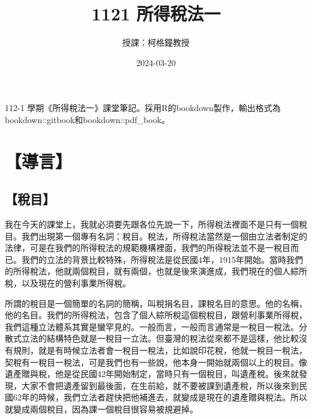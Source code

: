\documentclass[oneside,sub3section]{ctexbook}
\title{1121 所得稅法一}
\author{授課：柯格鐘教授}
\date{2024-03-20}
\begin{document}
\maketitle

\thispagestyle{empty}

\mbox{}
\vspace{10cm}
\begin{center}

    112-1 學期《所得稅法一》課堂筆記。採用R的bookdown製作，輸出格式為bookdown::gitbook和bookdown::pdf\_book。
    
\end{center}

\setlength{\abovedisplayskip}{-5pt}
\setlength{\abovedisplayshortskip}{-5pt}



{
\setcounter{tocdepth}{3}
\tableofcontents
}



\mainmatter

\hypertarget{ux5c0eux8a00}{%
\chapter{【導言】}\label{ux5c0eux8a00}}

\hypertarget{ux7a05ux76ee}{%
\section{【稅目】}\label{ux7a05ux76ee}}

我在今天的課堂上，我就必須要先跟各位先說一下，所得稅法裡面不是只有一個稅目。我們出現第一個專有名詞：稅目。稅法，所得稅法當然是一個由立法者制定的法律，可是在我們的所得稅法的規範機構裡面，我們的所得稅法並不是一稅目而已。我們的立法的背景比較特殊，所得稅法是從民國4年，1915年開始。當時我們的所得稅法，他就兩個稅目，就有兩個，也就是後來演進成，我們現在的個人綜所稅，以及現在的營利事業所得稅。

所謂的稅目是一個簡單的名詞的簡稱，叫稅捐名目，課稅名目的意思。他的名稱，他的名目。我們的所得稅法，包含了個人綜所稅這個稅稅目，跟營利事業所得稅，我們這種立法體系其實是蠻罕見的。一般而言，一般而言通常是一稅目一稅法。分散式立法的結構特色就是一稅目一立法。但臺灣的稅法從來都不是這樣，他比較沒有規則，就是有時候立法者會一稅目一稅法，比如說印花稅，他就一稅目一稅法，契稅有一稅目一稅法，可是我們也有一些說，他本身一開始就兩個以上的稅目。像遺產贈與稅，他是從民國42年開始制定，當時只有一個稅目，叫遺產稅。後來就發現，大家不會把遺產留到最後面，在生前給，就不要被課到遺產稅，所以後來到民國62年的時候，我們立法者趕快把他補進去，就變成是現在的遺產贈與稅法。所以就變成兩個稅目，因為課一個稅目很容易被規避掉。
\end{document}
